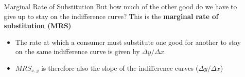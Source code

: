 \documentclass[12pt,t]{beamer}
\begin{document}
\begin{frame}{Marginal Rate of Substitution}
  But how much of the other good do we have to give up to stay on the indifference curve? This is the \textbf{marginal rate of substitution (MRS)}

  \begin{itemize}
    \item The rate at which a consumer must substitute one good for another to stay on the same indifference curve is given by $\Delta y / \Delta x$.

    \item $MRS_{x,y}$ is therefore also the slope of the indifference curves ($\Delta y / \Delta x$)
  \end{itemize}

\end{frame}
\end{document}
